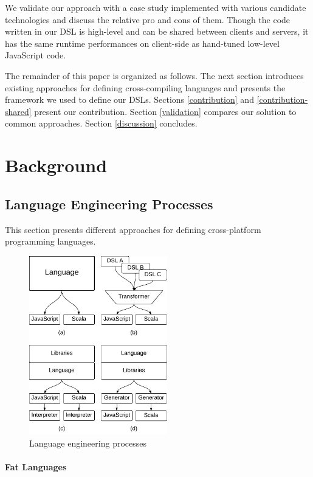 \documentclass[preprint]{sigplanconf}
\begin{document}
We validate our approach with a case study implemented with various candidate technologies and discuss the relative
pro and cons of them. Though the code written in our DSL is high-level and can be shared between clients and servers,
it has the same runtime performances on client-side as hand-tuned low-level JavaScript code.

The remainder of this paper is organized as follows. The next section introduces existing approaches for defining
cross-compiling languages and presents the framework we used to define our DSLs. Sections \ref{contribution} and
\ref{contribution-shared} present our contribution. Section \ref{validation} compares our solution to common
approaches. Section \ref{discussion} concludes.

\section{Background}

\subsection{Language Engineering Processes}

This section presents different approaches for defining cross-platform programming languages.

\begin{figure}
\begin{center}
\includegraphics[width=6cm]{langs.pdf}
\end{center}
\caption{Language engineering processes}
\label{langs}
\end{figure}

\paragraph{Fat Languages}
\end{document}
